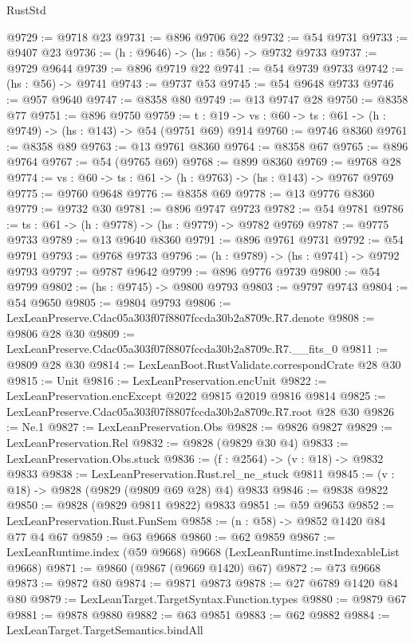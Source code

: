 \begin{lexlean}{RustStd}
\begin{coremodule}
@9729 := @9718 @23
@9731 := @896 @9706 @22
@9732 := @54 @9731
@9733 := @9407 @23
@9736 := (h : @9646) -> (hs : @56) -> @9732 @9733
@9737 := @9729 @9644
@9739 := @896 @9719 @22
@9741 := @54 @9739 @9733
@9742 := (hs : @56) -> @9741
@9743 := @9737 @53
@9745 := @54 @9648 @9733
@9746 := @957 @9640
@9747 := @8358 @80
@9749 := @13 @9747 @28
@9750 := @8358 @77
@9751 := @896 @9750
@9759 := {t : @19} -> {vs : @60} -> {ts : @61} -> (h : @9749) -> (hs : @143) -> @54 (@9751 @69) @914
@9760 := @9746 @8360
@9761 := @8358 @89
@9763 := @13 @9761 @8360
@9764 := @8358 @67
@9765 := @896 @9764
@9767 := @54 (@9765 @69)
@9768 := @899 @8360
@9769 := @9768 @28
@9774 := {vs : @60} -> {ts : @61} -> (h : @9763) -> (hs : @143) -> @9767 @9769
@9775 := @9760 @9648
@9776 := @8358 @69
@9778 := @13 @9776 @8360
@9779 := @9732 @30
@9781 := @896 @9747 @9723
@9782 := @54 @9781
@9786 := {ts : @61} -> (h : @9778) -> (hs : @9779) -> @9782 @9769
@9787 := @9775 @9733
@9789 := @13 @9640 @8360
@9791 := @896 @9761 @9731
@9792 := @54 @9791
@9793 := @9768 @9733
@9796 := (h : @9789) -> (hs : @9741) -> @9792 @9793
@9797 := @9787 @9642
@9799 := @896 @9776 @9739
@9800 := @54 @9799
@9802 := (hs : @9745) -> @9800 @9793
@9803 := @9797 @9743
@9804 := @54 @9650
@9805 := @9804 @9793
@9806 := LexLeanPreserve.Cdac05a303f07f8807fccda30b2a8709c.R7.denote
@9808 := @9806 @28 @30
@9809 := LexLeanPreserve.Cdac05a303f07f8807fccda30b2a8709c.R7.__fits_0
@9811 := @9809 @28 @30
@9814 := LexLeanBoot.RustValidate.correspondCrate @28 @30
@9815 := Unit
@9816 := LexLeanPreservation.encUnit
@9822 := LexLeanPreservation.encExcept @2022 @9815 @2019 @9816 @9814
@9825 := LexLeanPreserve.Cdac05a303f07f8807fccda30b2a8709c.R7.root @28 @30
@9826 := Ne.{1}
@9827 := LexLeanPreservation.Obs
@9828 := @9826 @9827
@9829 := LexLeanPreservation.Rel
@9832 := @9828 (@9829 @30 @4)
@9833 := LexLeanPreservation.Obs.stuck
@9836 := (f : @2564) -> (v : @18) -> @9832 @9833
@9838 := LexLeanPreservation.Rust.rel_ne_stuck @9811
@9845 := (v : @18) -> @9828 (@9829 (@9809 @69 @28) @4) @9833
@9846 := @9838 @9822
@9850 := @9828 (@9829 @9811 @9822) @9833
@9851 := @59 @9653
@9852 := LexLeanPreservation.Rust.FunSem
@9858 := (n : @58) -> @9852 @1420 @84 @77 @4 @67
@9859 := @63 @9668
@9860 := @62 @9859
@9867 := LexLeanRuntime.index (@59 @9668) @9668 (LexLeanRuntime.instIndexableList @9668)
@9871 := @9860 (@9867 (@9669 @1420) @67)
@9872 := @73 @9668
@9873 := @9872 @80
@9874 := @9871 @9873
@9878 := @27 @6789 @1420 @84 @80
@9879 := LexLeanTarget.TargetSyntax.Function.types
@9880 := @9879 @67
@9881 := @9878 @9880
@9882 := @63 @9851
@9883 := @62 @9882
@9884 := LexLeanTarget.TargetSemantics.bindAll

\end{coremodule}
\end{lexlean}
